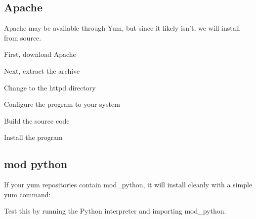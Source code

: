 
\subsection{Apache}
Apache may be available through Yum, but since it likely isn't, we will install from source.

\vspace{1pc}

First, download Apache


\vspace{1pc}

Next, extract the archive


\vspace{1pc}

Change to the httpd directory


\vspace{1pc}

Configure the program to your system


\vspace{1pc}

Build the source code


\vspace{1pc}

Install the program


\subsection{mod python}
If your yum repositories contain mod\_python, it will install cleanly with a simple yum command:

\vspace{1pc}


\vspace{1pc}

Test this by running the Python interpreter and importing mod\_python.


\vspace{1pc}


